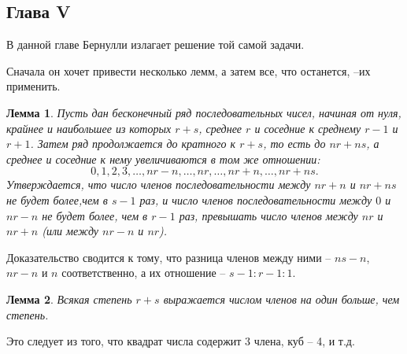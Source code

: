 \documentclass[12pt]{article}
\newtheorem{lemma}{Лемма}
\begin{document}
\subsection{Глава V}
В данной главе Бернулли излагает решение той самой задачи.

Сначала он хочет привести несколько лемм, а затем все, что останется, --их применить.
\begin{lemma} \label{lem1}
Пусть дан бесконечный ряд последовательных чисел, начиная от нуля, крайнее и наибольшее из которых $r+s$, среднее $r$ и соседние к среднему $r - 1$ и $r+1$. 
Затем ряд продолжается до кратного к $r+s$, то есть до $nr+ns$, а среднее и соседние к нему увеличиваются в том же отношении:
$$0, 1, 2, 3, \dots, nr-n, \dots, nr, \dots, nr+n, \dots, nr+ns.$$
Утверждается, что число членов последовательности между $nr+n$ и $nr+ns$ не будет более,чем в $s-1$ раз, и число членов последовательности между $0$ и $nr-n$ не будет более, чем в $r-1$ раз, превышать число членов между $nr$ и $nr+n$ (или между $nr-n$ и $nr$).
\end{lemma}
Доказательство сводится к тому, что разница членов между ними -- $ns-n$, $nr-n$ и $n$ соответственно, а их отношение -- $s-1 : r-1 : 1$.

\begin{lemma} \label{lem2}
Всякая степень $r+s$ выражается числом членов на один больше, чем степень.
\end{lemma}
Это следует из того, что квадрат числа содержит 3 члена, куб -- 4, и т.д.
 
\end{document}
